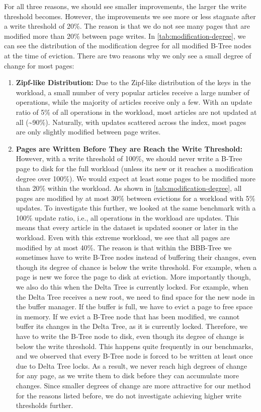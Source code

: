 For all three reasons, we should see smaller improvements, the larger the write threshold becomes.
However, the improvements we see more or less stagnate after a write threshold of 20\%.
The reason is that we do not see many pages that are modified more than 20\% between page writes.
In \autoref{tab:modification-degree}, we can see the distribution of the modification degree for all modified B-Tree nodes at the time of eviction.
There are two reasons why we only see a small degree of change for most pages:

\begin{enumerate}
\item \textbf{Zipf-like Distribution:}
Due to the Zipf-like distribution of the keys in the workload, a small number of very popular articles receive a large number of operations, while the majority of articles receive only a few.
With an update ratio of 5\% of all operations in the workload, most articles are not updated at all (\textasciitilde 90\%).
Naturally, with updates scattered across the index, most pages are only slightly modified between page writes.
\item \textbf{Pages are Written Before They are Reach the Write Threshold:}
However, with a write threshold of 100\%, we should never write a B-Tree page to disk for the full workload (unless its new or it reaches a modification degree over 100\%).
We would expect at least some pages to be modified more than 20\% within the workload.
As shown in \autoref{tab:modification-degree}, all pages are modified by at most 30\% between evictions for a workload with 5\% updates.
To investigate this further, we looked at the same benchmark with a 100\% update ratio, i.e., all operations in the workload are updates.
This means that every article in the dataset is updated sooner or later in the workload.
Even with this extreme workload, we see that all pages are modified by at most 40\%.
The reason is that within the BBB-Tree we sometimes have to write B-Tree nodes instead of buffering their changes, even though its degree of chance is below the write threshold.
For example, when a page is new we force the page to disk at eviction.
More importantly though, we also do this when the Delta Tree is currently locked.
For example, when the Delta Tree receives a new root, we need to find space for the new node in the buffer manager.
If the buffer is full, we have to evict a page to free space in memory.
If we evict a B-Tree node that has been modified, we cannot buffer its changes in the Delta Tree, as it is currently locked.
Therefore, we have to write the B-Tree node to disk, even though its degree of change is below the write threshold.
This happens quite frequently in our benchmarks, and we observed that every B-Tree node is forced to be written at least once due to Delta Tree locks.
As a result, we never reach high degrees of change for any page, as we write them to disk before they can accumulate more changes.
Since smaller degrees of change are more attractive for our method for the reasons listed before, we do not investigate achieving higher write thresholds further.
\end{enumerate}

